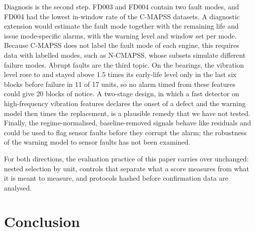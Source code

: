 \documentclass[a4paper,fleqn,doubleblind]{cas-dc}
\begin{document}
Diagnosis is the second step. FD003 and FD004 contain two fault modes, and FD004 had the lowest in-window rate of the C-MAPSS datasets. A diagnostic extension would estimate the fault mode together with the remaining life and issue mode-specific alarms, with the warning level and window set per mode. Because C-MAPSS does not label the fault mode of each engine, this requires data with labelled modes, such as N-CMAPSS, whose subsets simulate different failure modes. Abrupt faults are the third topic. On the bearings, the vibration level rose to and stayed above 1.5 times its early-life level only in the last six blocks before failure in 11 of 17 units, so no alarm timed from these features could give 20 blocks of notice. A two-stage design, in which a fast detector on high-frequency vibration features declares the onset of a defect and the warning model then times the replacement, is a plausible remedy that we have not tested. Finally, the regime-normalised, baseline-removed signals behave like residuals and could be used to flag sensor faults before they corrupt the alarm; the robustness of the warning model to sensor faults has not been examined.

For both directions, the evaluation practice of this paper carries over unchanged: nested selection by unit, controls that separate what a score measures from what it is meant to measure, and protocols hashed before confirmation data are analysed.

\section{Conclusion}\label{sec:9}
\end{document}

